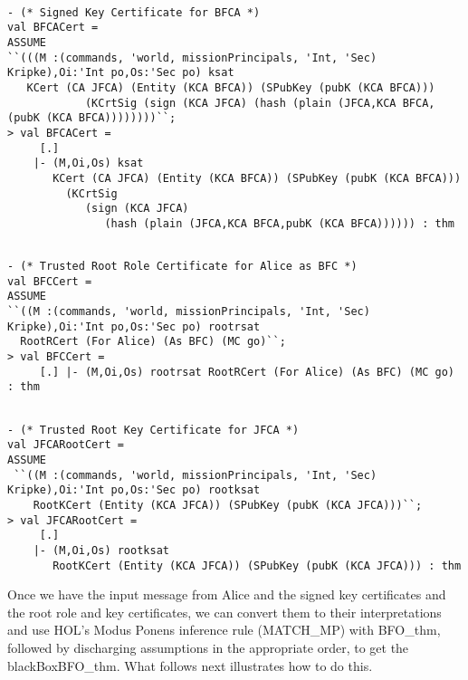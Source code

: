\documentclass[10pt,twoside]{article}
\begin{document}
\begin{session}
  \begin{scriptsize}
\begin{verbatim}

- (* Signed Key Certificate for BFCA *)
val BFCACert =
ASSUME
``(((M :(commands, 'world, missionPrincipals, 'Int, 'Sec) Kripke),Oi:'Int po,Os:'Sec po) ksat
   KCert (CA JFCA) (Entity (KCA BFCA)) (SPubKey (pubK (KCA BFCA)))
            (KCrtSig (sign (KCA JFCA) (hash (plain (JFCA,KCA BFCA,(pubK (KCA BFCA))))))))``;
> val BFCACert =
     [.]
    |- (M,Oi,Os) ksat
       KCert (CA JFCA) (Entity (KCA BFCA)) (SPubKey (pubK (KCA BFCA)))
         (KCrtSig
            (sign (KCA JFCA)
               (hash (plain (JFCA,KCA BFCA,pubK (KCA BFCA)))))) : thm
\end{verbatim}
  \end{scriptsize}
\end{session}

\begin{session}
  \begin{scriptsize}
\begin{verbatim}

- (* Trusted Root Role Certificate for Alice as BFC *)
val BFCCert =
ASSUME
``((M :(commands, 'world, missionPrincipals, 'Int, 'Sec) Kripke),Oi:'Int po,Os:'Sec po) rootrsat
  RootRCert (For Alice) (As BFC) (MC go)``;
> val BFCCert =
     [.] |- (M,Oi,Os) rootrsat RootRCert (For Alice) (As BFC) (MC go) : thm
\end{verbatim}
  \end{scriptsize}
\end{session}

\begin{session}
  \begin{scriptsize}
\begin{verbatim}

- (* Trusted Root Key Certificate for JFCA *)
val JFCARootCert = 
ASSUME
 ``((M :(commands, 'world, missionPrincipals, 'Int, 'Sec) Kripke),Oi:'Int po,Os:'Sec po) rootksat 
    RootKCert (Entity (KCA JFCA)) (SPubKey (pubK (KCA JFCA)))``;
> val JFCARootCert =
     [.]
    |- (M,Oi,Os) rootksat
       RootKCert (Entity (KCA JFCA)) (SPubKey (pubK (KCA JFCA))) : thm
\end{verbatim}
  \end{scriptsize}
\end{session}

Once we have the input message from Alice and the signed key
certificates and the root role and key certificates, we can convert
them to their interpretations and use HOL's Modus Ponens inference
rule (MATCH\_MP) with BFO\_thm, followed by discharging assumptions in
the appropriate order, to get the blackBoxBFO\_thm. What follows next
illustrates how to do this.
\end{document}
